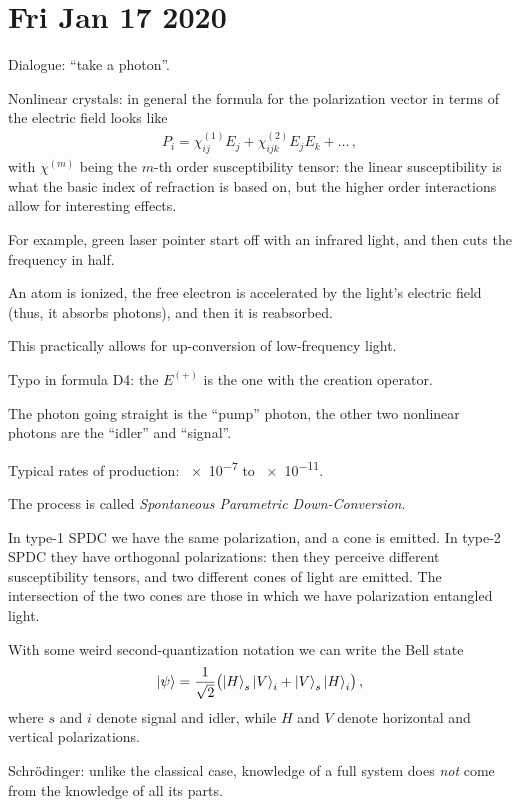 \documentclass[main.tex]{subfiles}
\begin{document}
\section*{Fri Jan 17 2020}

Dialogue: ``take a photon''. 

Nonlinear crystals: in general the formula for the polarization vector in terms of the electric field looks like 
%
\begin{align}
P_{i} = \chi_{ij}^{(1)} E_{j} + \chi_{ijk}^{(2)} E_{j} E_{k} + \dots
\,,
\end{align}
%
with \(\chi^{(m)}\) being the \(m\)-th order susceptibility tensor: the linear susceptibility is what the basic index of refraction is based on, but the higher order interactions allow for interesting effects. 

For example, green laser pointer start off with an infrared light, and then cuts the frequency in half. 

An atom is ionized, the free electron is accelerated by the light's electric field (thus, it absorbs photons), and then it is reabsorbed. 

This practically allows for up-conversion of low-frequency light.

Typo in formula D4: the \(E^{(+)}\) is the one with the creation operator. 

The photon going straight is the ``pump'' photon, the other two nonlinear photons are the ``idler'' and ``signal''. 

Typical rates of production: \num{e-7} to \num{e-11}.

The process is called \emph{Spontaneous Parametric Down-Conversion}.

In type-1 SPDC we have the same polarization, and a cone is emitted. In type-2 SPDC they have orthogonal polarizations: then they perceive different susceptibility tensors, and two different cones of light are emitted. 
The intersection of the two cones are those in which we have polarization entangled light. 

With some weird second-quantization notation we can write the Bell state 
%
\begin{align}
\ket{\psi } = \frac{1}{\sqrt{2}} \qty(\ket{H}_{s} \ket{V}_{i} + \ket{V}_{s} \ket{H}_{i})
\,,
\end{align}
%
where \(s\) and \(i\) denote signal and idler, while \(H\) and \(V\) denote horizontal and vertical polarizations. 

Schrödinger: unlike the classical case, knowledge of a full system does \emph{not} come from the knowledge of all its parts. 
\end{document}
